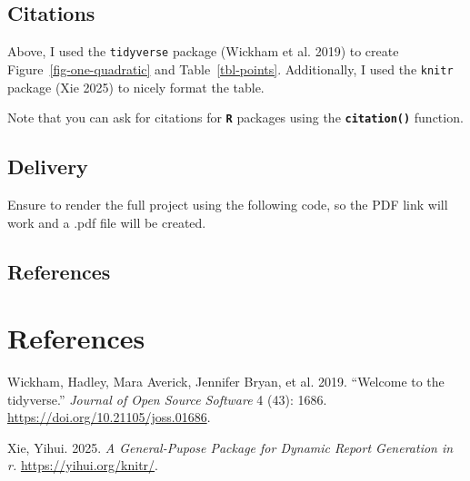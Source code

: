 \documentclass[
]{article}
\newlength{\cslhangindent}
\newenvironment{CSLReferences}[2] %
 {\begin{list}{}{%
  \setlength{\itemindent}{0pt}
  \setlength{\leftmargin}{0pt}
  \setlength{\parsep}{0pt}
  \ifodd #1
   \setlength{\leftmargin}{\cslhangindent}
   \setlength{\itemindent}{-1\cslhangindent}
  \fi
  \setlength{\itemsep}{#2\baselineskip}}}
 {\end{list}}
\begin{document}
\normalsize

\subsection{Citations}\label{citations}

Above, I used the \texttt{tidyverse} package (Wickham et al. 2019) to
create Figure~\ref{fig-one-quadratic} and Table~\ref{tbl-points}.
Additionally, I used the \texttt{knitr} package (Xie 2025) to nicely
format the table.

Note that you can ask for citations for \textbf{\texttt{R}} packages
using the \textbf{\texttt{citation()}} function.

\subsection{Delivery}\label{delivery}

Ensure to render the full project using the following code, so the PDF
link will work and a .pdf file will be created.

\subsection{References}\label{references}

\section*{References}\label{bibliography}

\protect{}\label{refs}
\begin{CSLReferences}{1}{1}
Wickham, Hadley, Mara Averick, Jennifer Bryan, et al. 2019. {``Welcome
to the {tidyverse}.''} \emph{Journal of Open Source Software} 4 (43):
1686. \url{https://doi.org/10.21105/joss.01686}.

Xie, Yihui. 2025. \emph{A General-Pupose Package for Dynamic Report
Generation in r.} \url{https://yihui.org/knitr/}.

\end{CSLReferences}
\end{document}
